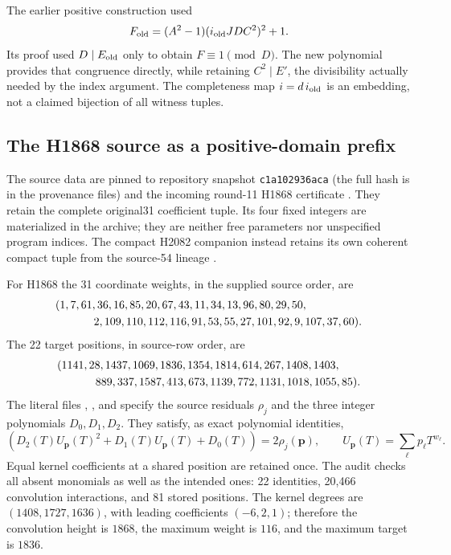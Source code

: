 The earlier positive construction used
\[
 F_{\rm old}=(A^2-1)(i_{\rm old}JDC^2)^2+1.
\]
Its proof used \(D\mid E_{\rm old}\) only to obtain \(F\equiv1\pmod D\).
The new polynomial provides that congruence directly, while retaining
\(C^2\mid E'\), the divisibility actually needed by the index argument.
The completeness map \(i=d\,i_{\rm old}\) is an embedding, not a claimed
bijection of all witness tuples.

\subsection{The H1868 source as a positive-domain prefix}

The source data are pinned to repository snapshot
\texttt{c1a102936aca} (the full hash is in the provenance files) and the incoming
round-11 H1868 certificate \cite{repo,round11}. They retain the complete
original31 coefficient tuple. Its four fixed integers are materialized in
the archive; they are neither free parameters nor unspecified program
indices. The compact H2082 companion instead retains its own coherent
compact tuple from the source-54 lineage \cite{source54}.

For H1868 the 31 coordinate weights, in the supplied source order, are
\[
\begin{split}
&(1,7,61,36,16,85,20,67,43,11,34,13,96,80,29,50,\\
&\hspace{12mm}2,109,110,112,116,91,53,55,27,101,92,9,107,37,60).
\end{split}
\]
The 22 target positions, in source-row order, are
\[
\begin{split}
&(1141,28,1437,1069,1836,1354,1814,614,267,1408,1403,\\
&\hspace{12mm}889,337,1587,413,673,1139,772,1131,1018,1055,85).
\end{split}
\]
The literal files
\texttt{},
\texttt{}, and
\texttt{}
specify the source residuals \(\rho_j\) and the three integer polynomials
\(D_0,D_1,D_2\). They satisfy, as exact polynomial identities,
\begin{equation}
 [T^{q_j}]\left(D_2(T)U_{\mathbf p}(T)^2+
 D_1(T)U_{\mathbf p}(T)+D_0(T)\right)=2\rho_j(\mathbf p),
 \qquad U_{\mathbf p}(T)=\sum_\ell p_\ell T^{w_\ell}.
 \label{eq:h1868-identities}
\end{equation}
Equal kernel coefficients at a shared position are retained once.
The audit checks all absent monomials as well as the intended ones:
22 identities, 20,466 convolution interactions, and 81 stored positions.
The kernel degrees are \((1408,1727,1636)\), with leading coefficients
\((-6,2,1)\); therefore the convolution height is \(1868\), the maximum
weight is \(116\), and the maximum target is \(1836\).

